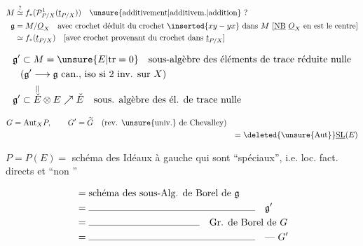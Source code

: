 

\[ \begin{aligned}
 M&\overset{?}{\simeq}f_*(\mathcal P^1_{P/X}(\underline t_{P/X}))\quad\text{\unsure{additivement|additivem.|addition} ?}\\
 \mathfrak g&=M/\underline O_X \quad\text{avec crochet déduit du crochet }\inserted{xy-yx}\text{ dans }M\ [\underline{\mathrm{NB}}\ \underline O_X\text{ en est le centre}]\\
 &\simeq f_*(\underline t_{P/X})\quad [\text{avec crochet provenant du crochet dans }\underline t_{P/X}]
 \end{aligned} \]

\[ \begin{aligned}
 \mathfrak g'&\subset M=\unsure{E|\mathrm{tr}=0}\quad\text{sous-algèbre des éléments de trace réduite nulle}\\
 &(\mathfrak g'\longrightarrow\mathfrak g\ \text{can., iso si 2 inv. sur }X)\\
 \mathfrak g'&\subset\overset{\Vert}{\check E}\otimes E\nearrow\check E\quad\text{sous. algèbre des él. de trace nulle}
 \end{aligned} \]

\[ \begin{aligned}
 G&=\mathrm{Aut}_X P,\qquad G'=\widetilde G\quad(\text{rev. \unsure{univ.} de Chevalley})\\
 &&=\deleted{\unsure{\mathrm{Aut}}}\underline{\mathrm{SL}}(E)
 \end{aligned} \]


$P=P(E)={}$ schéma des Idéaux à gauche qui sont ``spéciaux'', i.e. loc. fact. directs et ``non \uline{}'' 

\[ \begin{aligned}
 &=\text{schéma des sous-Alg. de Borel de }\mathfrak g\\
 &=\rule{6cm}{0.3pt}\quad\mathfrak g'\\
 &=\rule{4cm}{0.3pt}\quad\text{Gr. de Borel de }G\\
 &=\rule{6cm}{0.3pt}\quad\text{--- }G'
 \end{aligned} \]



